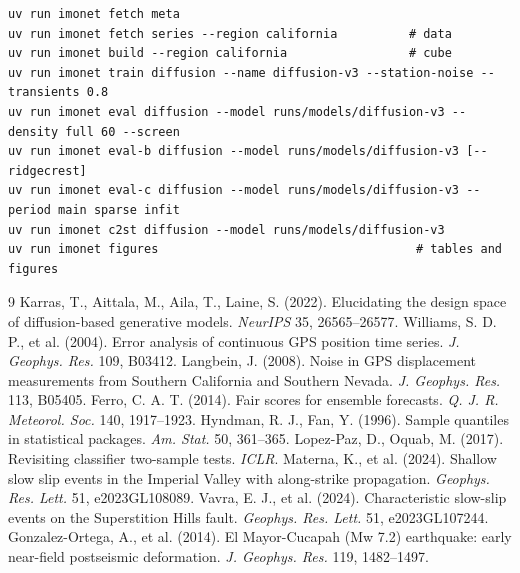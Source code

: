 \documentclass[11pt,a4paper]{article}
\begin{document}
\begin{footnotesize}
\begin{verbatim}
uv run imonet fetch meta
uv run imonet fetch series --region california          # data
uv run imonet build --region california                 # cube
uv run imonet train diffusion --name diffusion-v3 --station-noise --transients 0.8
uv run imonet eval diffusion --model runs/models/diffusion-v3 --density full 60 --screen
uv run imonet eval-b diffusion --model runs/models/diffusion-v3 [--ridgecrest]
uv run imonet eval-c diffusion --model runs/models/diffusion-v3 --period main sparse infit
uv run imonet c2st diffusion --model runs/models/diffusion-v3
uv run imonet figures                                    # tables and figures
\end{verbatim}
\end{footnotesize}

\begin{thebibliography}{9}\small
{} Karras, T., Aittala, M., Aila, T., Laine, S. (2022). Elucidating the design space of diffusion-based generative models. \emph{NeurIPS} 35, 26565–26577.
 Williams, S. D. P., et al. (2004). Error analysis of continuous GPS position time series. \emph{J. Geophys. Res.} 109, B03412.
 Langbein, J. (2008). Noise in GPS displacement measurements from Southern California and Southern Nevada. \emph{J. Geophys. Res.} 113, B05405.
 Ferro, C. A. T. (2014). Fair scores for ensemble forecasts. \emph{Q. J. R. Meteorol. Soc.} 140, 1917–1923.
 Hyndman, R. J., Fan, Y. (1996). Sample quantiles in statistical packages. \emph{Am. Stat.} 50, 361–365.
 Lopez-Paz, D., Oquab, M. (2017). Revisiting classifier two-sample tests. \emph{ICLR}.
 Materna, K., et al. (2024). Shallow slow slip events in the Imperial Valley with along-strike propagation. \emph{Geophys. Res. Lett.} 51, e2023GL108089.
 Vavra, E. J., et al. (2024). Characteristic slow-slip events on the Superstition Hills fault. \emph{Geophys. Res. Lett.} 51, e2023GL107244.
 Gonzalez-Ortega, A., et al. (2014). El Mayor-Cucapah (Mw 7.2) earthquake: early near-field postseismic deformation. \emph{J. Geophys. Res.} 119, 1482–1497.
\end{thebibliography}
\end{document}
